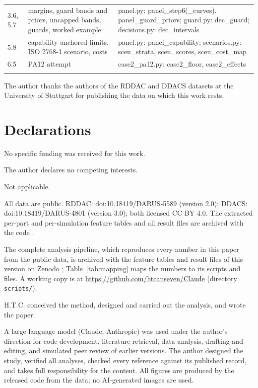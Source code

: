 \documentclass[pdflatex,sn-basic,lineno]{sn-jnl}
\providecommand{\DIFaddendFL}{} %
\DeclareRobustCommand{\DIFaddendFL}{\DIFOaddendFL \let\includegraphics\DIFOincludegraphics} %
\begin{document}
\begin{appendices}
\begin{table}[p]
\begin{tabular}{@{}L{0.95cm}L{4.2cm}L{7.5cm}@{}}
3.6, 5.7 & margins, guard bands and priors, uncapped bands, guards, worked example & panel.py: panel\_step6(\_curves), panel\_guard\_priors; guard.py: dec\_guard; decisions.py: dec\_intervals \\
5.8 & capability-anchored limits, ISO 2768-1 scenario, costs & panel.py: panel\_capability; scenarios.py: scen\_strata, scen\_scores, scen\_cost\_map \\
6.5 & PA12 attempt & case2\_pa12.py: case2\_floor, case2\_effects \\
\botrule
\end{tabular}
\DIFaddendFL \end{table}

\end{appendices}

\backmatter

The author thanks the authors of the RDDAC and DDACS datasets at the University of Stuttgart for publishing the data on which this work rests.

\section*{Declarations}

No specific funding was received for this work.

The author declares no competing interests.

Not applicable.

All data are public. RDDAC: doi:10.18419/DARUS-5589 (version 2.0); DDACS: doi:10.18419/DARUS-4801 (version 3.0); both licensed CC BY 4.0. The extracted per-part and per-simulation feature tables and all result files are archived with the code \citep{canseven2026archive}.

The complete analysis pipeline, which reproduces every number in this paper from the public data, is archived with the feature tables and result files of this version on Zenodo \citep{canseven2026archive}; Table~\ref{tab:mapping} maps the numbers to its scripts and files. A working copy is at \url{https://github.com/htcanseven/Claude} (directory \texttt{scripts/}).

H.T.C. conceived the method, designed and carried out the analysis, and wrote the paper.

A large language model (Claude, Anthropic) was used under the author's direction for code development, literature retrieval, data analysis, drafting and editing, and simulated peer review of earlier versions. The author designed the study, verified all analyses, checked every reference against its published record, and takes full responsibility for the content. All figures are produced by the released code from the data; no AI-generated images are used.


\FloatBarrier
{\small
}
\end{document}
